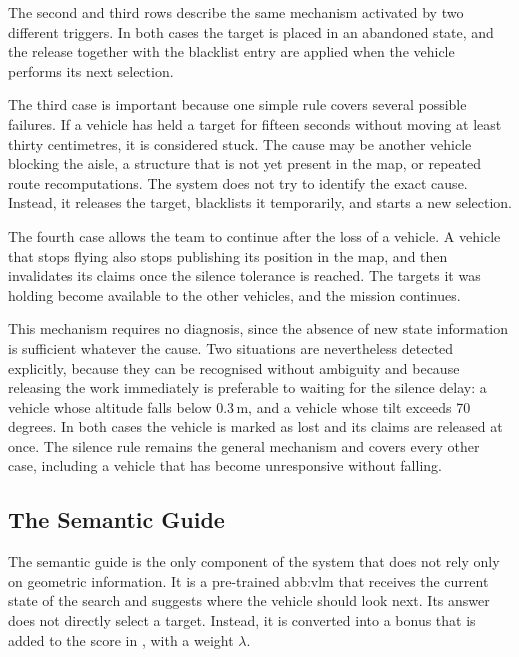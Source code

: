 \FloatBarrier

The second and third rows describe the same mechanism activated by two different
triggers. In both cases the target is placed in an abandoned state, and the
release together with the blacklist entry are applied when the vehicle performs
its next selection.

The third case is important because one simple rule covers several possible
failures. If a vehicle has held a target for fifteen seconds without moving at
least thirty centimetres, it is considered stuck. The cause may be another vehicle
blocking the aisle, a structure that is not yet present in the map, or repeated
route recomputations. The system does not try to identify the exact cause.
Instead, it releases the target, blacklists it temporarily, and starts a new
selection.

The fourth case allows the team to continue after the loss of a vehicle. A
vehicle that stops flying also stops publishing its position in the map, and
 then invalidates its claims once the silence tolerance
is reached. The targets it was holding become available to the other vehicles,
and the mission continues.

This mechanism requires no diagnosis, since the absence of new state information
is sufficient whatever the cause. Two situations are nevertheless detected
explicitly, because they can be recognised without ambiguity and because
releasing the work immediately is preferable to waiting for the silence delay: a
vehicle whose altitude falls below 0.3\,m, and a vehicle whose tilt exceeds 70
degrees. In both cases the vehicle is marked as lost and its claims are released
at once. The silence rule remains the general mechanism and covers every other
case, including a vehicle that has become unresponsive without falling.

\subsection{The Semantic Guide}%
\label{subsec:sys:semantic}

The semantic guide is the only component of the system that does not rely only on
geometric information. It is a pre-trained \gls{abb:vlm} that receives the
current state of the search and suggests where the vehicle should look next. Its
answer does not directly select a target. Instead, it is converted into a bonus
that is added to the score in , with a weight $\lambda$.

